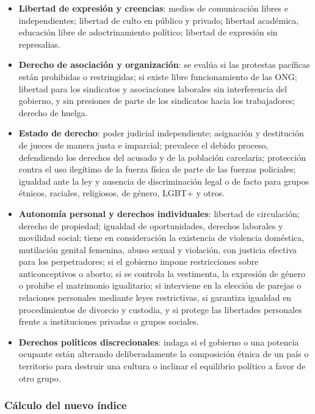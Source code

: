 \documentclass[
  10pt,
]{article}
\begin{document}
\begin{itemize}
\item
  \textbf{Libertad de expresión y creencias}: medios de comunicación
  libres e independientes; libertad de culto en público y privado;
  libertad académica, educación libre de adoctrinamiento político;
  libertad de expresión sin represalias.
\item
  \textbf{Derecho de asociación y organización}: se evalúa si las
  protestas pacíficas están prohibidas o restringidas; si existe libre
  funcionamiento de las ONG; libertad para los sindicatos y asociaciones
  laborales sin interferencia del gobierno, y sin presiones de parte de
  los sindicatos hacia los trabajadores; derecho de huelga.
\item
  \textbf{Estado de derecho}: poder judicial independiente; asignación y
  destitución de jueces de manera justa e imparcial; prevalece el debido
  proceso, defendiendo los derechos del acusado y de la población
  carcelaria; protección contra el uso ilegítimo de la fuerza física de
  parte de las fuerzas policiales; igualdad ante la ley y ausencia de
  discriminación legal o de facto para grupos étnicos, raciales,
  religiosos, de género, LGBT+ y otros.
\item
  \textbf{Autonomía personal y derechos individuales}: libertad de
  circulación; derecho de propiedad; igualdad de oportunidades, derechos
  laborales y movilidad social; tiene en consideración la existencia de
  violencia doméstica, mutilación genital femenina, abuso sexual y
  violación, con justicia efectiva para los perpetradores; si el
  gobierno impone restricciones sobre anticonceptivos o aborto; si se
  controla la vestimenta, la expresión de género o prohibe el matrimonio
  igualitario; si interviene en la elección de parejas o relaciones
  personales mediante leyes restrictivas, si garantiza igualdad en
  procedimientos de divorcio y custodia, y si protege las libertades
  personales frente a instituciones privadas o grupos sociales.
\item
  \textbf{Derechos políticos discrecionales}: indaga si el gobierno o
  una potencia ocupante están alterando deliberadamente la composición
  étnica de un país o territorio para destruir una cultura o inclinar el
  equilibrio político a favor de otro grupo.
\end{itemize}

\subsubsection{Cálculo del nuevo
índice}\label{cuxe1lculo-del-nuevo-uxedndice}
\end{document}
